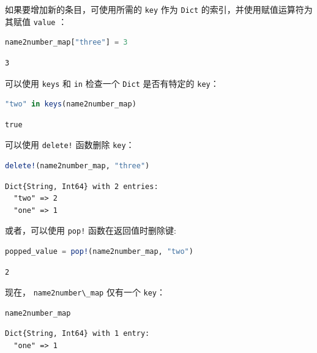 \documentclass[
  notoc %
]{tufte-book}
\newcommand{\passthrough}[1]{#1}
\begin{document}
如果要增加新的条目，可使用所需的 \passthrough{\lstinline!key!} 作为
\passthrough{\lstinline!Dict!} 的索引，并使用赋值运算符为其赋值
\passthrough{\lstinline!value!} ：

\begin{lstlisting}[language=Julia]
name2number_map["three"] = 3
\end{lstlisting}

\begin{lstlisting}[language=Output]
3
\end{lstlisting}

可以使用 \passthrough{\lstinline!keys!} 和 \passthrough{\lstinline!in!}
检查一个 \passthrough{\lstinline!Dict!} 是否有特定的
\passthrough{\lstinline!key!}：

\begin{lstlisting}[language=Julia]
"two" in keys(name2number_map)
\end{lstlisting}

\begin{lstlisting}[language=Output]
true
\end{lstlisting}

可以使用 \passthrough{\lstinline"delete!"} 函数删除
\passthrough{\lstinline!key!}：

\begin{lstlisting}[language=Julia]
delete!(name2number_map, "three")
\end{lstlisting}

\begin{lstlisting}[language=Output]
Dict{String, Int64} with 2 entries:
  "two" => 2
  "one" => 1
\end{lstlisting}

或者，可以使用 \passthrough{\lstinline"pop!"} 函数在返回值时删除键:

\begin{lstlisting}[language=Julia]
popped_value = pop!(name2number_map, "two")
\end{lstlisting}

\begin{lstlisting}[language=Output]
2
\end{lstlisting}

现在， \passthrough{\lstinline!name2number\_map!} 仅有一个
\passthrough{\lstinline!key!}：

\begin{lstlisting}[language=Julia]
name2number_map
\end{lstlisting}

\begin{lstlisting}[language=Output]
Dict{String, Int64} with 1 entry:
  "one" => 1
\end{lstlisting}
\end{document}
